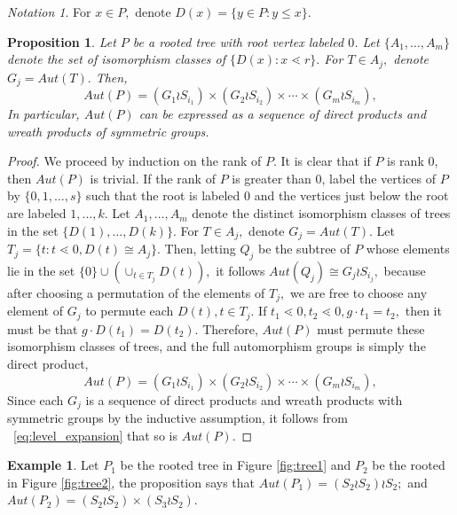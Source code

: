 \documentclass[10 pt]{amsart}
\theoremstyle{plain}
\newtheorem{prop}[thm]{Proposition}
\theoremstyle{definition}
\newtheorem{eg}[thm]{Example}
\theoremstyle{remark}
\newtheorem{note}[thm]{Notation}
\numberwithin{equation}{section}
\begin{document}
\begin{note}
For $x \in P,$ denote $D(x) = \{y \in P: y \leq x\}.$
\end{note}
\begin{prop}
\label{prop:automorphism_trees}
Let $P$ be a rooted tree with root vertex labeled $0$. Let $\{A_1,\ldots,A_m\}$ denote the set of isomorphism classes of $\{D(x):x\lessdot r\}.$ For $T \in A_j,$ denote $G_j = Aut(T).$ Then, 
\begin{equation}
\label{eq:level_expansion}
Aut(P) = (G_1 \wr S_{i_1}) \times (G_2 \wr S_{i_2}) \times \cdots \times (G_m\wr S_{i_m}),
\end{equation}
In particular, $Aut(P)$ can be expressed as a sequence of direct products and wreath products of symmetric groups.
\end{prop}

\begin{proof}
We proceed by induction on the rank of $P$.  It is clear that if $P$ is rank 0, then $Aut(P)$ is trivial.  If the rank of $P$ is greater than 0, label the vertices of $P$ by $\{0,1,\ldots, s\}$ such that the root is labeled $0$ and the vertices just below the root are labeled $1, \ldots, k.$ Let $A_1,\ldots, A_m$ denote the distinct isomorphism classes of trees in the set $\{D(1),\ldots, D(k)\}.$ For $T \in A_j,$ denote $G_j = Aut(T).$ 
Let $T_j = \{t:t\lessdot 0,D(t) \cong A_j\}.$ Then, letting $Q_j$ be the subtree of $P$ whose elements lie in the set $\{0\} \cup (\cup_{t \in T_j} D(t)),$ it follows $Aut(Q_j) \cong G_j \wr S_{i_j},$ because after choosing a permutation of the elements of $T_j,$ we are free to choose any element of $G_j$ to permute each $D(t),t \in T_j$. If $t_1 \lessdot 0,t_2 \lessdot 0,g \cdot t_1 = t_2,$ then it must be that $g \cdot D(t_1) = D(t_2).$ Therefore, $Aut(P)$ must permute these isomorphism classes of trees, and the full automorphism groups is simply the direct product, 
\begin{equation}
\label{eq:level_expansion}
Aut(P) = (G_1 \wr S_{i_1}) \times (G_2 \wr S_{i_2}) \times \cdots \times (G_m\wr S_{i_m}),
\end{equation}
Since each $G_j$ is a sequence of direct products and wreath products with symmetric groups by the inductive assumption, it follows from ~\eqref{eq:level_expansion} that so is $Aut(P).$
\end{proof}

\begin{eg}
Let $P_1$ be the rooted tree  in Figure \ref{fig:tree1} and $P_2$ be the rooted in Figure \ref{fig:tree2}, the proposition says that $Aut (P_1) = (S_2 \wr S_2)\wr S_2;$ and $Aut(P_2) = (S_2 \wr S_2) \times (S_3 \wr S_2) $. 
\end{eg}
\end{document}
